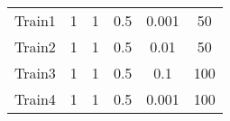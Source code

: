 \documentclass[11pt,fleqn]{book} %
\begin{document}
\begin{table}[h!]
\begin{tabular}{ c c c c c c }
																																																																																																																																																																																																																																																															      Train1 & 1 & 1 & 0.5 & 0.001 & 50\\
																																																																																																																																																																																																																																																															          Train2 & 1 & 1 & 0.5 & 0.01 & 50\\
																																																																																																																																																																																																																																																																      Train3 & 1 & 1 & 0.5 & 0.1 & 100\\
																																																																																																																																																																																																																																																																          Train4 & 1 & 1 & 0.5 & 0.001 & 100\\
																																																																																																																																																																																																																																																																	      

\end{tabular}
\end{table}
\end{document}
